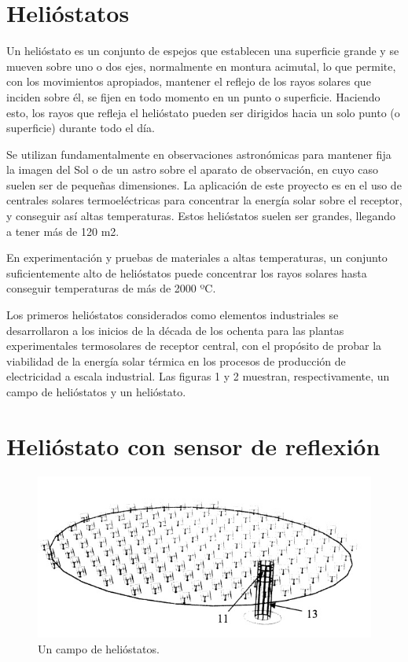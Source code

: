 \section{Helióstatos}

Un helióstato es un conjunto de espejos que establecen una superficie grande y se mueven sobre uno o dos ejes, normalmente en montura acimutal, lo que permite, con los movimientos apropiados, mantener el reflejo de los rayos solares que inciden sobre él, se fijen en todo momento en un punto o superficie. Haciendo esto, los rayos que refleja el helióstato pueden ser dirigidos hacia un solo punto (o superficie) durante todo el día.

Se utilizan fundamentalmente en observaciones astronómicas para mantener fija la imagen del Sol o de un astro sobre el aparato de observación, en cuyo caso suelen ser de pequeñas dimensiones. La aplicación de este proyecto es en el uso de centrales solares termoeléctricas para concentrar la energía solar sobre el receptor, y conseguir así altas temperaturas. Estos helióstatos suelen ser grandes, llegando a tener más de 120 m2.

En experimentación y pruebas de materiales a altas temperaturas, un conjunto suficientemente alto de helióstatos puede concentrar los rayos solares hasta conseguir temperaturas de más de 2000 ºC.

Los primeros helióstatos considerados como elementos industriales se desarrollaron a los inicios de la década de los ochenta para las plantas experimentales termosolares de receptor central, con el propósito de probar la viabilidad de la energía solar térmica en los procesos de producción de electricidad a escala industrial. Las figuras 1 y 2 muestran, respectivamente, un campo de helióstatos y un helióstato.

\section{Helióstato con sensor de reflexión}

\begin{figure}[h!]
  	\centering
	\includegraphics[scale=0.7]{FotosPaginasWebHeliostatos/unnamed(1).jpg}
	\caption{Un campo de helióstatos.~\cite{OepmWebSite} \label{fig:FotosPaginasWebHeliostatos/unnamed(1).jpg}}
\end{figure}


